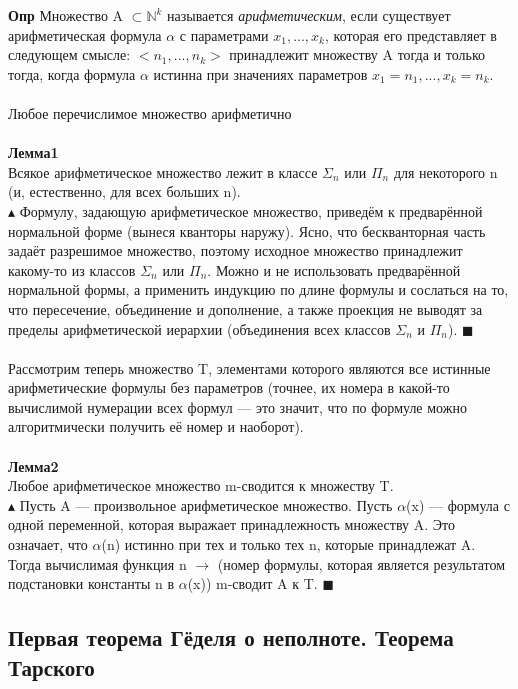 \textbf{Опр} Множество A $\subset \mathbb{N}^k$ называется \textit{арифметическим}, если существует арифметическая формула $\alpha$ с параметрами $x_1, . . . , x_k$, которая его представляет в следующем смысле: $<n_1, . . . , n_k>$ принадлежит множеству A тогда и только тогда, когда формула $\alpha$ истинна при значениях параметров $x_1 = n_1, . . . , x_k = n_k$.
\\
\\
Любое перечислимое множество арифметично
\\
\\
\textbf{Лемма1}\\
Всякое арифметическое множество лежит в классе $\Sigma_n$ или $\Pi_n$ для некоторого n (и, естественно, для всех больших n).
\\
$\blacktriangle$ Формулу, задающую арифметическое множество, приведём к предварённой нормальной форме (вынеся кванторы наружу). Ясно, что бескванторная часть задаёт разрешимое множество, поэтому исходное множество принадлежит какому-то из классов $\Sigma_n$ или $\Pi_n$. Можно и не использовать предварённой нормальной формы, а применить индукцию по длине формулы и сослаться на то, что пересечение, объединение и дополнение, а также проекция не выводят за пределы арифметической иерархии (объединения всех классов $\Sigma_n$ и $\Pi_n$). $\blacksquare$
\\
\\
Рассмотрим теперь множество T, элементами которого являются
все истинные арифметические формулы без параметров (точнее, их номера в какой-то вычислимой нумерации всех формул — это значит, что по формуле можно алгоритмически получить её номер и наоборот).
\\
\\
\textbf{Лемма2}\\ Любое арифметическое множество m-сводится к множеству T.\\
$\blacktriangle$ Пусть A — произвольное арифметическое множество. Пусть $\alpha$(x) — формула с одной переменной, которая выражает принадлежность множеству A. Это означает, что $\alpha$(n) истинно при тех и только тех n, которые принадлежат A.
Тогда вычислимая функция n $\rightarrow$ (номер формулы, которая является
результатом подстановки константы n в $\alpha$(x)) m-сводит A к T. $\blacksquare$
\\
\subsection{Первая теорема Гёделя о неполноте. Теорема Тарского}

